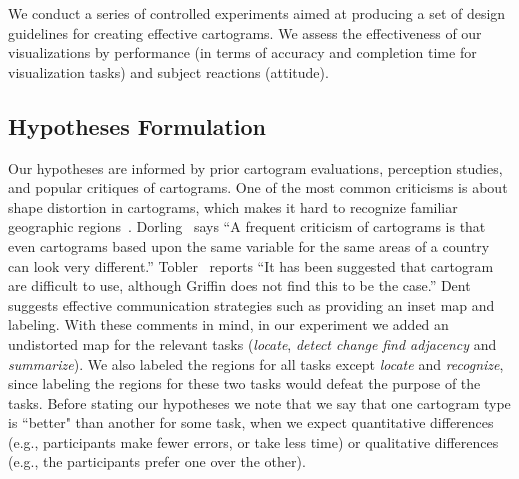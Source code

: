 \documentclass[10pt,journal,compsoc]{IEEEtran}
\begin{document}
 We conduct a series of controlled experiments aimed
at producing a set of design guidelines for creating effective cartograms. We assess the effectiveness of our visualizations by performance (in terms of accuracy and completion time for visualization tasks) and subject reactions (attitude). 

\begin{comment}
\textbf{Performance of subjects:}
This criteria is used to test the effectiveness of the visualization and it examines the user's performance of the tasks. Effectiveness is measured by the time spent to complete tasks~\cite{koua2006evaluating}, the percentage of completed tasks~\cite{sweeney1993evaluating}, the accuracy of the completed tasks etc. 
 
\textbf{Attitude of subjects:}
This refers to user reactions and opinions about the compatibility, flexibility of the tool. User feedback can be collected through questionnaire, survey responses, ratings and comments from interviews. 

\end{comment}

\subsection{Hypotheses Formulation}
\label{sec:hypotheses}




Our hypotheses are informed by prior cartogram evaluations, perception studies,  and popular critiques of cartograms.
One of the most common criticisms is about shape distortion in cartograms, which makes it hard to recognize familiar geographic regions~\cite{Tobler04}. 
Dorling~\cite{dorling96} says ``A frequent criticism of cartograms is that even cartograms based upon the same variable for the same areas of a country can look very different.'' 
Tobler~\cite{Tobler04} reports ``It has been suggested that cartogram are difficult to use, although Griffin does not find this to be the case.'' 
Dent~\cite{dent1975}  suggests effective communication strategies such as providing an inset map and labeling.
With these comments in mind, in our experiment we added an undistorted map for the relevant tasks (\textit{locate}, \textit{detect change} \textit{find adjacency} and \textit{summarize}). 
We also labeled the regions for all tasks except \textit{locate} and \textit{recognize}, since labeling the regions for these two tasks would defeat the purpose of the tasks.
Before stating our hypotheses we note that we say that one cartogram type is ``better" than another for some task, when we expect quantitative differences (e.g., participants make fewer errors, or take less time) or qualitative differences (e.g., the participants prefer one over the other). 
\end{document}
